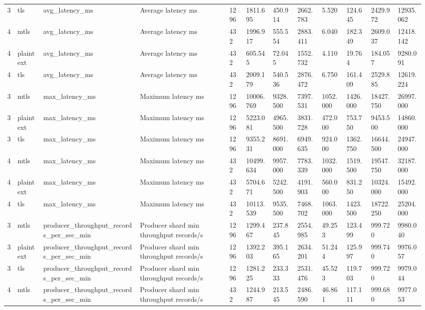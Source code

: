 \begin{longtable}{llllllllllll}
3 & tls & avg\_latency\_ms & Average latency ms & 1296 & 1811.695 & 450.914 & 2662.783 & 5.520 & 124.645 & 2429.972 & 12935.062 \\
4 & mtls & avg\_latency\_ms & Average latency ms & 432 & 1996.917 & 555.554 & 2883.411 & 6.040 & 182.349 & 2609.037 & 12418.142 \\
4 & plaintext & avg\_latency\_ms & Average latency ms & 432 & 605.545 & 72.045 & 1552.732 & 4.110 & 19.764 & 184.057 & 9280.091 \\
4 & tls & avg\_latency\_ms & Average latency ms & 432 & 2009.179 & 540.536 & 2876.472 & 6.750 & 161.409 & 2529.885 & 12619.224 \\
3 & mtls & max\_latency\_ms & Maximum latency ms & 1296 & 10006.769 & 9328.500 & 7397.531 & 1052.000 & 1426.000 & 18427.750 & 26997.000 \\
3 & plaintext & max\_latency\_ms & Maximum latency ms & 1296 & 5223.081 & 4965.500 & 3831.728 & 472.000 & 753.750 & 9453.500 & 14860.000 \\
3 & tls & max\_latency\_ms & Maximum latency ms & 1296 & 9355.231 & 8691.000 & 6949.635 & 924.000 & 1362.750 & 16644.500 & 24947.000 \\
4 & mtls & max\_latency\_ms & Maximum latency ms & 432 & 10499.634 & 9957.000 & 7783.339 & 1032.000 & 1519.500 & 19547.750 & 32187.000 \\
4 & plaintext & max\_latency\_ms & Maximum latency ms & 432 & 5704.671 & 5242.500 & 4191.903 & 560.000 & 831.250 & 10324.000 & 15492.000 \\
4 & tls & max\_latency\_ms & Maximum latency ms & 432 & 10113.539 & 9535.500 & 7468.702 & 1063.000 & 1423.500 & 18722.250 & 25204.000 \\
3 & mtls & producer\_throughput\_records\_per\_sec\_min & Producer shard min throughput records/s & 1296 & 1299.467 & 237.845 & 2554.985 & 49.253 & 123.499 & 999.720 & 9980.040 \\
3 & plaintext & producer\_throughput\_records\_per\_sec\_min & Producer shard min throughput records/s & 1296 & 1392.203 & 395.165 & 2634.201 & 51.244 & 125.997 & 999.740 & 9976.057 \\
3 & tls & producer\_throughput\_records\_per\_sec\_min & Producer shard min throughput records/s & 1296 & 1281.225 & 233.333 & 2531.476 & 45.523 & 119.703 & 999.720 & 9979.044 \\
4 & mtls & producer\_throughput\_records\_per\_sec\_min & Producer shard min throughput records/s & 432 & 1244.987 & 213.545 & 2486.590 & 46.861 & 117.111 & 999.680 & 9977.053 \\

\end{longtable}
